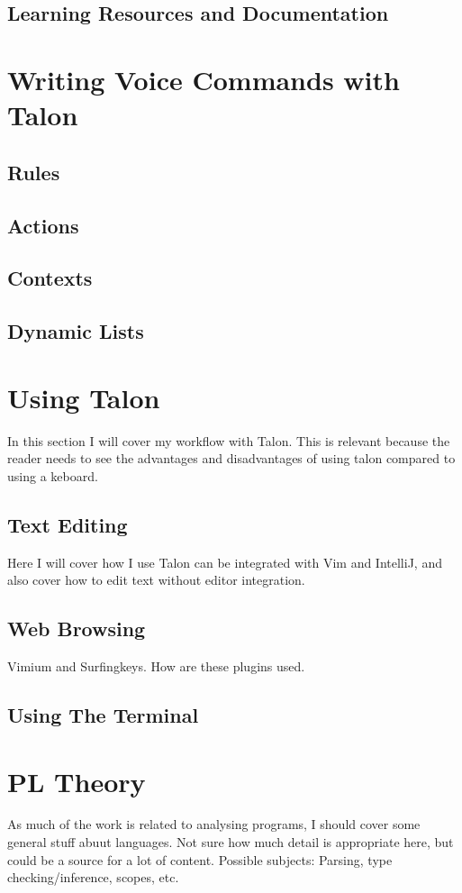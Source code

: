 \documentclass[a4paper,english]{ifimaster}
\begin{document}
\subsection{Learning Resources and Documentation}

\section{Writing Voice Commands with Talon}
\subsection{Rules}
\subsection{Actions}
\subsection{Contexts}
\subsection{Dynamic Lists}

\section{Using Talon}
In this section I will cover my workflow with Talon. This is relevant because the reader needs to see the advantages and disadvantages of using talon compared to using a keboard.
\subsection{Text Editing}
Here I will cover how I use Talon can be integrated with Vim and IntelliJ, and also cover how to edit text without editor integration.
\subsection{Web Browsing}
Vimium and Surfingkeys. How are these plugins used.
\subsection{Using The Terminal}

\section{PL Theory}
As much of the work is related to analysing programs, I should cover some general stuff abuut languages.
Not sure how much detail is appropriate here, but could be a source for a lot of content.
Possible subjects: Parsing, type checking/inference, scopes, etc.
\end{document}
